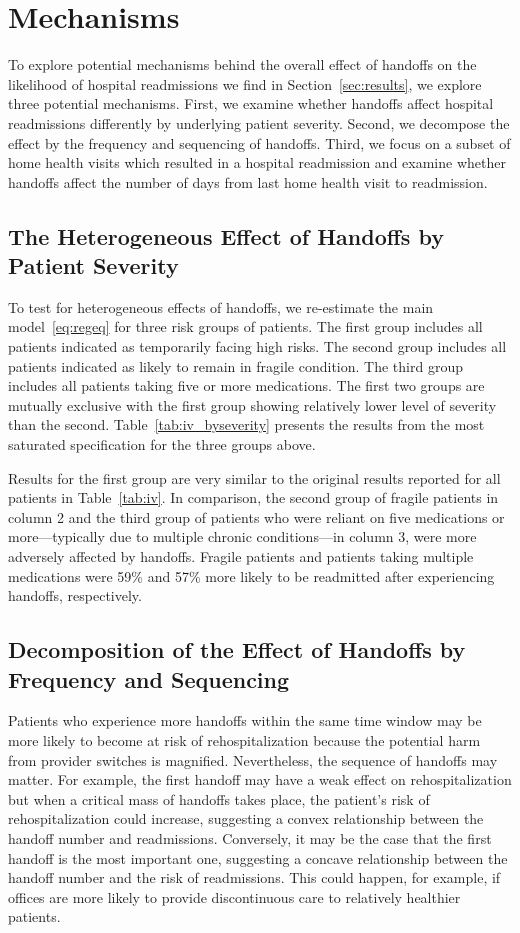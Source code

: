 \documentclass[final,12pt, notitlepage]{article}
\begin{document}
\section{Mechanisms} \label{sec:mechanism}

To explore potential mechanisms behind the overall effect of handoffs on the likelihood of hospital readmissions we find in Section~\ref{sec:results}, we explore three potential mechanisms. First, we examine whether handoffs affect hospital readmissions differently by underlying patient severity. Second, we decompose the effect by the frequency and sequencing of handoffs. Third, we focus on a subset of home health visits which resulted in a hospital readmission and examine whether handoffs affect the number of days from last home health visit to readmission.

\subsection{The Heterogeneous Effect of Handoffs by Patient Severity}
To test for heterogeneous effects of handoffs, we re-estimate the main model~\ref{eq:regeq} for three risk groups of patients. The first group includes all patients indicated as temporarily facing high risks. The second group includes all patients indicated as likely to remain in fragile condition. The third group includes all patients taking five or more medications. The first two groups are mutually exclusive with the first group showing relatively lower level of severity than the second. Table~\ref{tab:iv_byseverity} presents the results from the most saturated specification for the three groups above.

Results for the first group are very similar to the original results reported for all patients in Table~\ref{tab:iv}. In comparison, the second group of fragile patients in column 2 and the third group of patients who were reliant on five medications or more---typically due to multiple chronic conditions---in column 3, were more adversely affected by handoffs.
Fragile patients and patients taking multiple medications were 59\% and 57\% more likely to be readmitted after experiencing handoffs, respectively.


\subsection{Decomposition of the Effect of Handoffs by Frequency and Sequencing}
Patients who experience more handoffs within the same time window may be more likely to become at risk of rehospitalization because the potential harm from provider switches is magnified.
Nevertheless, the sequence of handoffs may matter.
For example, the first handoff may have a weak effect on rehospitalization but when a critical mass of handoffs takes place, the patient's risk of rehospitalization could increase, suggesting a convex relationship between the handoff number and readmissions.
Conversely, it may be the case that the first handoff is the most important one, suggesting a concave relationship between the handoff number and the risk of readmissions. This could happen, for example, if offices are more likely to provide discontinuous care to relatively healthier patients.
\end{document}
